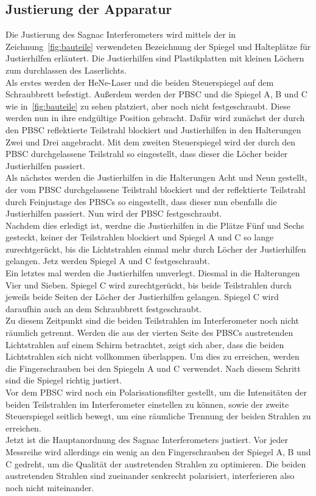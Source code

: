 \subsection{Justierung der Apparatur}
%
Die Justierung des Sagnac Interferometers wird mittels der in 
Zeichnung~\ref{fig:bauteile} verwendeten Bezeichnung der Spiegel 
und Halteplätze für Justierhilfen erläutert. Die Justierhilfen 
sind Plastikplatten mit kleinen Löchern zum durchlassen des 
Laserlichts.\\
Als erstes werden der HeNe-Laser und die beiden 
Steuerspiegel auf dem 
Schraubbrett befestigt. Außerdem werden der PBSC und 
die Spiegel A, B und C wie in~\ref{fig:bauteile} zu sehen platziert, 
aber noch nicht festgeschraubt.
 Diese werden nun in ihre endgültige Position gebracht.
Dafür wird zunächst der durch den PBSC reflektierte Teilstrahl 
blockiert und Justierhilfen in den Halterungen Zwei und Drei 
angebracht. Mit dem zweiten Steuerspiegel wird der durch den PBSC 
durchgelassene Teilstrahl so eingestellt, dass dieser die Löcher 
beider Justierhilfen passiert.\\
Als nächstes werden die Justierhilfen in die Halterungen Acht und 
Neun gestellt, der vom PBSC durchgelassene Teilstrahl blockiert und 
der reflektierte Teilstrahl durch Feinjustage des PBSCs so 
eingestellt, dass dieser nun ebenfalls die Justierhilfen passiert. 
Nun wird der PBSC festgeschraubt.\\
Nachdem dies erledigt ist, werdne die Justierhilfen in die Plätze 
Fünf und Sechs gesteckt, keiner der Teilstrahlen blockiert und 
Spiegel A und C so lange zurechtgerückt, bis die Lichtstrahlen 
einmal mehr durch Löcher der Justierhilfen gelangen. Jetz 
werden Spiegel A und C festgeschraubt.\\
Ein letztes mal werden die Justierhilfen umverlegt. Diesmal 
in die Halterungen Vier und Sieben. Spiegel C wird zurechtgerückt, 
bis beide Teilstrahlen durch jeweils beide Seiten der Löcher der 
Justierhilfen gelangen. Spiegel C wird daraufhin auch an dem 
Schraubbrett festgeschraubt.\\
Zu diesem Zeitpunkt sind die beiden Teilstrahlen im Interferometer 
noch nicht räumlich getrennt. Werden die aus der vierten Seite des 
PBSCs austretenden Lichtstrahlen auf einem Schirm betrachtet, zeigt 
sich aber, dass die beiden Lichtstrahlen sich nicht vollkommen 
überlappen. Um dies zu erreichen, werden die Fingerschrauben bei 
den Spiegeln A und C verwendet. Nach diesem Schritt sind die Spiegel 
richtig justiert.\\
Vor dem PBSC wird noch ein Polarisationsfilter gestellt, um die 
Intensitäten der beiden Teilstrahlen im Interferometer einstellen 
zu können, sowie der zweite Steuerspiegel seitlich bewegt, um 
eine räumliche Trennung der beiden Strahlen zu erreichen.\\
Jetzt ist die Hauptanordnung des Sagnac Interferometers justiert. 
Vor jeder Messreihe wird allerdings ein wenig an den Fingerschrauben 
der Spiegel A, B und C gedreht, um die Qualität der austretenden 
Strahlen zu optimieren.
Die beiden austretenden Strahlen sind zueinander senkrecht 
polarisiert, interferieren also noch nicht miteinander.\\
%
